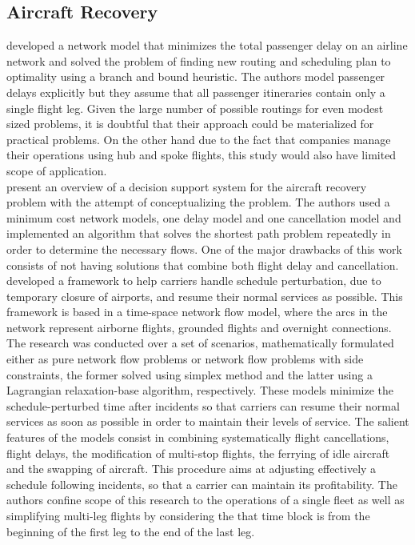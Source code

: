 \documentclass[ijoo,nonblindrev]{informs-ijoo}
\begin{document}
\subsection{Aircraft Recovery}\label{sec:aircRecovery}
\citep{TEODOROVIC1984} developed a network model that minimizes the total passenger delay on an airline network and solved the problem of finding new routing and scheduling plan to optimality using a branch and bound heuristic. The authors model passenger delays explicitly but they assume that all passenger itineraries contain only a single flight leg. Given the large number of possible routings for even modest sized problems, it is doubtful that their approach could be materialized for practical problems. On the other hand due to the fact that companies manage their operations using hub and spoke flights, this study would also have limited scope of application.\\
\citep{Jarrah1993} present an overview of a decision support system for the aircraft recovery problem with the attempt of conceptualizing the problem. The authors used a minimum cost network models, one delay model and one cancellation model and implemented an algorithm that solves the shortest path problem repeatedly in order to determine the necessary flows. One of the major drawbacks of this work consists of not having solutions that combine both flight delay and cancellation.
\citep{Yan1997} developed a framework to help carriers handle schedule perturbation, due to temporary closure of airports, and resume their normal services as possible. This framework is based in a time-space network flow model, where the arcs in the network represent airborne flights, grounded flights and overnight connections. The research was conducted over a set of scenarios, mathematically formulated either as pure network flow problems or network flow problems with side constraints, the former solved using simplex method and the latter using a Lagrangian relaxation-base algorithm, respectively. These models minimize the schedule-perturbed time after incidents so that carriers can resume their normal services as soon as possible in order to maintain their levels of service. The salient features of the models consist in combining systematically flight cancellations, flight delays, the modification of multi-stop flights, the ferrying of idle aircraft and the swapping of aircraft. This procedure aims at adjusting effectively a schedule following incidents, so that a carrier can maintain its profitability.  The authors confine scope of this research to the operations of a single fleet as well as simplifying multi-leg flights by considering the that time block is from the beginning of the first leg to the end of the last leg.\\
\end{document}
